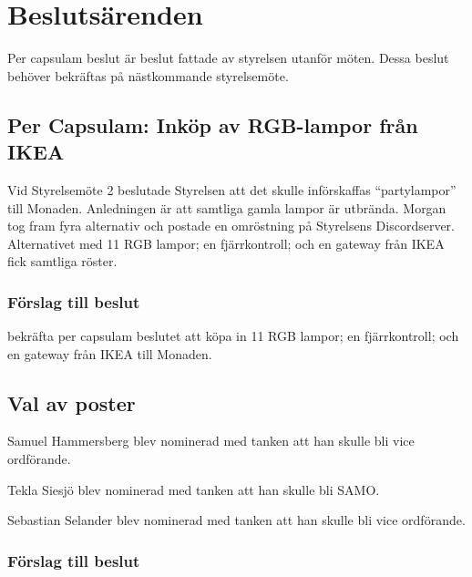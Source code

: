 \documentclass[protokoll]{dvd}
\begin{document}

\section{Beslutsärenden}

Per capsulam beslut är beslut fattade av styrelsen utanför möten.
Dessa beslut behöver bekräftas på nästkommande styrelsemöte.

\subsection{Per Capsulam: Inköp av RGB-lampor från IKEA}

Vid Styrelsemöte 2 beslutade Styrelsen att det skulle införskaffas ``partylampor'' till Monaden.
Anledningen är att samtliga gamla lampor är utbrända.
Morgan tog fram fyra alternativ och postade en omröstning på Styrelsens Discordserver.
Alternativet med 11 RGB lampor; en fjärrkontroll; och en gateway från IKEA fick samtliga röster.

\subsubsection*{Förslag till beslut}

\begin{attsatser}
    \item bekräfta per capsulam beslutet att köpa in 11 RGB lampor; en fjärrkontroll; och en gateway från IKEA till Monaden.
\end{attsatser}

\subsection{Val av poster}

Samuel Hammersberg blev nominerad med tanken att han skulle bli vice ordförande.

Tekla Siesjö blev nominerad med tanken att han skulle bli SAMO.

Sebastian Selander blev nominerad med tanken att han skulle bli vice ordförande.

\subsubsection*{Förslag till beslut}
\end{document}
